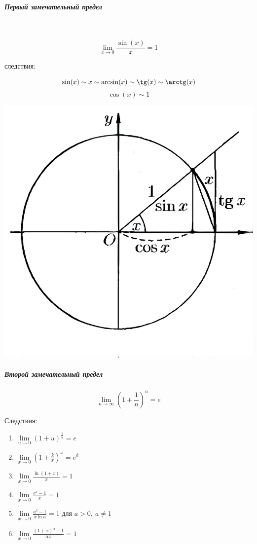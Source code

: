 \documentclass[12pt, a4]{article}
\begin{document}
\subparagraph{Первый замечательный предел} \mbox{}\\
\begin{minipage}{0.6\textwidth}
	\[\lim_{x\to 0}\frac{\sin(x)}{x} =1 \]
	\vfill
	\begin{center}
		следствия:
	\end{center}
	\[ \sin(x)\sim x \sim \arcsin(x) \sim \tg(x) \sim \arctg(x) \]
	\[ \cos(x) \sim 1 \]
	\vfill
\end{minipage}
\hfill
\begin{minipage}{0.4\textwidth}
		\includegraphics[scale=0.2]{1_predel_norm}
\end{minipage}

\subparagraph{Второй замечательный предел}

\[ \lim_{n\to \infty} (1+\frac{1}{n})^{n} = e \]

Следствия:
\begin{enumerate}[leftmargin=2cm]
	\item $\lim\limits_{u\to 0} (1+u)^{\frac{1}{u}} = e$
	
	\item $\lim\limits_{x\to 0} (1+\frac{k}{x})^{x} = e^k$
	
	\item $\lim\limits_{x\to 0} \frac{\ln(1+x)}{x} = 1$
	
	\item $\lim\limits_{x\to 0} \frac{e^x-1}{x} = 1$
	
	\item $\lim\limits_{x\to 0} \frac{a^x-1}{x\ln a} = 1$ для $a>0, \ a \neq 1$
	
	\item $\lim\limits_{x\to 0} \frac{(1+x)^{\alpha}-1}{\alpha x} = 1$
\end{enumerate}
\end{document}
